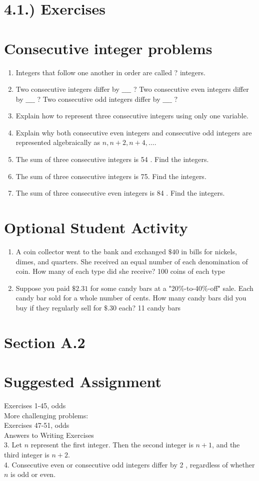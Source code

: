 \documentclass{ximera}
\begin{document}
\section*{4.1.) Exercises}
\section*{Consecutive integer problems}
\begin{enumerate}
  \item Integers that follow one another in order are called ? integers.
  \item Two consecutive integers differ by $\_\_\_\_$ ? Two consecutive even integers differ by $\_\_\_\_$ ? Two consecutive odd integers differ by $\_\_\_\_$ $?$
  \item Explain how to represent three consecutive integers using only one variable.
  \item Explain why both consecutive even integers and consecutive odd integers are represented algebraically as $n, n+2, n+4, \ldots$.
  \item The sum of three consecutive integers is 54 . Find the integers.
  \item The sum of three consecutive integers is 75. Find the integers.
  \item The sum of three consecutive even integers is 84 . Find the integers.
\end{enumerate}

\section*{Optional Student Activity}
\begin{enumerate}
  \item A coin collector went to the bank and exchanged $\$ 40$ in bills for nickels, dimes, and quarters. She received an equal number of each denomination of coin. How many of each type did she receive? 100 coins of each type
  \item Suppose you paid $\$ 2.31$ for some candy bars at a "20\%-to-40\%-off" sale. Each candy bar sold for a whole number of cents. How many candy bars did you buy if they regularly sell for $\$ .30$ each? 11 candy bars
\end{enumerate}

\section*{Section A.2}
\section*{Suggested Assignment}
Exercises 1-45, odds\\
More challenging problems:\\
Exercises 47-51, odds\\
Answers to Writing Exercises\\
3. Let $n$ represent the first integer. Then the second integer is $n+1$, and the third integer is $n+2$.\\
4. Consecutive even or consecutive odd integers differ by 2 , regardless of whether $n$ is odd or even.
\end{document}
